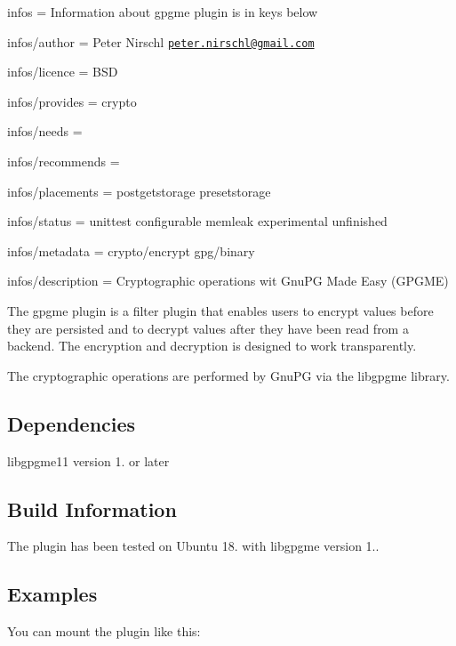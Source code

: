 
\begin{DoxyItemize}
\item infos = Information about gpgme plugin is in keys below
\item infos/author = Peter Nirschl \href{mailto:peter.nirschl@gmail.com}{\tt peter.\+nirschl@gmail.\+com}
\item infos/licence = B\+SD
\item infos/provides = crypto
\item infos/needs =
\item infos/recommends =
\item infos/placements = postgetstorage presetstorage
\item infos/status = unittest configurable memleak experimental unfinished
\item infos/metadata = crypto/encrypt gpg/binary
\item infos/description = Cryptographic operations wit Gnu\+PG Made Easy (G\+P\+G\+ME)
\end{DoxyItemize}

The {\ttfamily gpgme} plugin is a filter plugin that enables users to encrypt values before they are persisted and to decrypt values after they have been read from a backend. The encryption and decryption is designed to work transparently.

The cryptographic operations are performed by Gnu\+PG via the {\ttfamily libgpgme} library.

\subsection*{Dependencies}


\begin{DoxyItemize}
\item {\ttfamily libgpgme11} version 1. or later
\end{DoxyItemize}

\subsection*{Build Information}

The plugin has been tested on Ubuntu 18. with {\ttfamily libgpgme} version 1..

\subsection*{Examples}

You can mount the plugin like this\+:


